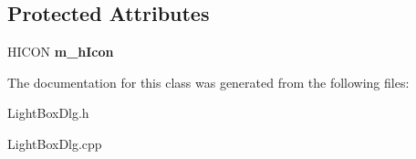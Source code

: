 \subsection*{Protected Attributes}
\begin{DoxyCompactItemize}
\item 
\hypertarget{class_c_light_box_dlg_ac807943f089cabf4e3ce1293b6e2108b}{H\-I\-C\-O\-N {\bfseries m\-\_\-h\-Icon}}\label{class_c_light_box_dlg_ac807943f089cabf4e3ce1293b6e2108b}

\end{DoxyCompactItemize}


The documentation for this class was generated from the following files\-:\begin{DoxyCompactItemize}
\item 
Light\-Box\-Dlg.\-h\item 
Light\-Box\-Dlg.\-cpp\end{DoxyCompactItemize}
